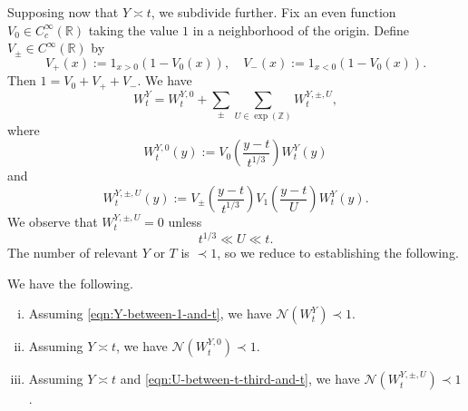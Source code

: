 \documentclass[reqno]{amsart} 
\begin{document}
Supposing now that $Y \asymp t$, we subdivide further.  Fix an even function $V_0 \in C_c^\infty(\mathbb{R})$ taking the value $1$ in a neighborhood of the origin.  Define $V_{\pm} \in C^\infty(\mathbb{R})$ by
\begin{equation*}
  V_+(x) := 1_{x > 0}(1 - V_0(x)), \quad V_-(x) := 1_{x<0}(1 - V_0(x)).
\end{equation*}
Then $1 = V_0 + V_+ + V_-$.  We have
\begin{equation*}
  W_t^{Y} =
  W_t^{Y,0}
  +
  \sum _{\pm}
  \sum _{U \in \exp(\mathbb{Z})}
  W_t^{Y,\pm,U},
\end{equation*}
where
\begin{equation*}
  W_t^{Y,0}(y) := V_0\left(\frac{y - t}{t ^{1/3} }\right)  W_t^Y(y)
\end{equation*}
and
\begin{equation*}
  W_t^{Y,\pm,U}(y) :=
  V_{\pm} \left(\frac{y - t}{t ^{1/3} }\right)
  V_1 \left( \frac{y - t}{U} \right) W_t^Y(y).
\end{equation*}
We observe that $W_t^{Y,\pm, U} = 0$ unless
\begin{equation}\label{eqn:U-between-t-third-and-t}
  t ^{1/3} \ll U \ll t.
\end{equation}
The number of relevant $Y$ or $T$ is $\prec 1$, so we reduce to establishing the following.
\begin{proposition}\label{proposition:reduction-after-dyadic-decopm}
  We have the following.
  \begin{enumerate}[(i)]
  \item Assuming \eqref{eqn:Y-between-1-and-t}, we have $\mathcal{N} (W _t ^Y ) \prec 1$.
  \item Assuming $Y \asymp t$, we have $\mathcal{N} (W _t ^{Y, 0}) \prec 1$.
  \item Assuming $Y \asymp t$ and \eqref{eqn:U-between-t-third-and-t}, we have $\mathcal{N} (W _{t} ^{Y, \pm, U}) \prec 1$.
  \end{enumerate}
\end{proposition}
\end{document}

